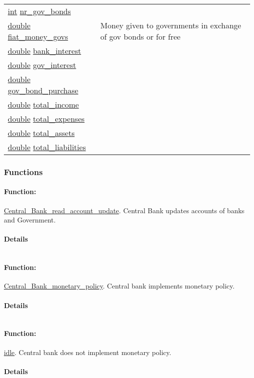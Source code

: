 \documentclass[a4paper,11pt]{article}
\begin{document}
\begin{center}
\begin{longtable}[H!]{ll}
\url{int} \url{nr_gov_bonds} & \parbox{10cm}{} \\
\url{double} \url{fiat_money_govs} & \parbox{10cm}{Money given to governments in exchange of gov bonds or for free} \\
\url{double} \url{bank_interest} & \parbox{10cm}{} \\
\url{double} \url{gov_interest} & \parbox{10cm}{} \\
\url{double} \url{gov_bond_purchase} & \parbox{10cm}{} \\
\url{double} \url{total_income} & \parbox{10cm}{} \\
\url{double} \url{total_expenses} & \parbox{10cm}{} \\
\url{double} \url{total_assets} & \parbox{10cm}{} \\
\url{double} \url{total_liabilities} & \parbox{10cm}{} \\
\end{longtable}
\end{center}
\subsubsection{Functions}
\paragraph{Function:}\url{Central_Bank_read_account_update}.
Central Bank updates accounts of banks and Government.
\paragraph{Details}
\begin{verbatim}
\end{verbatim}
\paragraph{Function:}\url{Central_Bank_monetary_policy}.
Central bank implements monetary policy.
\paragraph{Details}
\begin{verbatim}
\end{verbatim}
\paragraph{Function:}\url{idle}.
Central bank does not implement monetary policy.
\paragraph{Details}
\begin{verbatim}
\end{verbatim}
\end{document}
